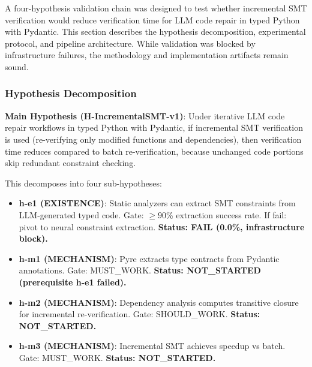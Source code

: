 
A four-hypothesis validation chain was designed to test whether incremental SMT verification would reduce verification time for LLM code repair in typed Python with Pydantic. This section describes the hypothesis decomposition, experimental protocol, and pipeline architecture. While validation was blocked by infrastructure failures, the methodology and implementation artifacts remain sound.

\subsubsection{Hypothesis Decomposition}

\textbf{Main Hypothesis (H-IncrementalSMT-v1)}: Under iterative LLM code repair workflows in typed Python with Pydantic, if incremental SMT verification is used (re-verifying only modified functions and dependencies), then verification time reduces compared to batch re-verification, because unchanged code portions skip redundant constraint checking.

This decomposes into four sub-hypotheses:

\begin{itemize}
\item \textbf{h-e1 (EXISTENCE)}: Static analyzers can extract SMT constraints from LLM-generated typed code. Gate: $\geq 90$\% extraction success rate. If fail: pivot to neural constraint extraction. \textbf{Status: FAIL (0.0\%, infrastructure block).}
\end{itemize}

\begin{itemize}
\item \textbf{h-m1 (MECHANISM)}: Pyre extracts type contracts from Pydantic annotations. Gate: MUST\_WORK. \textbf{Status: NOT\_STARTED (prerequisite h-e1 failed).}
\end{itemize}

\begin{itemize}
\item \textbf{h-m2 (MECHANISM)}: Dependency analysis computes transitive closure for incremental re-verification. Gate: SHOULD\_WORK. \textbf{Status: NOT\_STARTED.}
\end{itemize}

\begin{itemize}
\item \textbf{h-m3 (MECHANISM)}: Incremental SMT achieves speedup vs batch. Gate: MUST\_WORK. \textbf{Status: NOT\_STARTED.}
\end{itemize}

